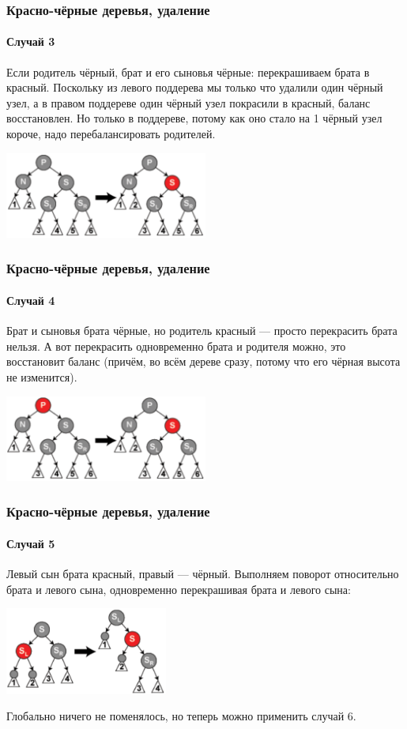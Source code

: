 \documentclass[xetex,mathserif,serif]{beamer}
\begin{document}
	\begin{frame}
		\frametitle{Красно-чёрные деревья, удаление}
		\framesubtitle{Случай 3}
		Если родитель чёрный, брат и его сыновья чёрные: перекрашиваем брата в красный. Поскольку из левого поддерева мы только что удалили один чёрный узел, а в правом поддереве один чёрный узел покрасили в красный, баланс восстановлен. Но только в поддереве, потому как оно стало на 1 чёрный узел короче, надо перебалансировать родителей.
		\begin{center}
			\includegraphics[width=0.5\textwidth]{redBlackRemoval2.png}
		\end{center}
	\end{frame}

	\begin{frame}
		\frametitle{Красно-чёрные деревья, удаление}
		\framesubtitle{Случай 4}
		Брат и сыновья брата чёрные, но родитель красный --- просто перекрасить брата нельзя. А вот перекрасить одновременно брата и родителя можно, это восстановит баланс (причём, во всём дереве сразу, потому что его чёрная высота не изменится).
		\begin{center}
			\includegraphics[width=0.5\textwidth]{redBlackRemoval3.png}
		\end{center}
	\end{frame}

	\begin{frame}
		\frametitle{Красно-чёрные деревья, удаление}
		\framesubtitle{Случай 5}
		Левый сын брата красный, правый --- чёрный. Выполняем поворот относительно брата и левого сына, одновременно перекрашивая брата и левого сына:
		\begin{center}
			\includegraphics[width=0.4\textwidth]{redBlackRemoval4.png}
		\end{center}
		Глобально ничего не поменялось, но теперь можно применить случай 6.
	\end{frame}
\end{document}
